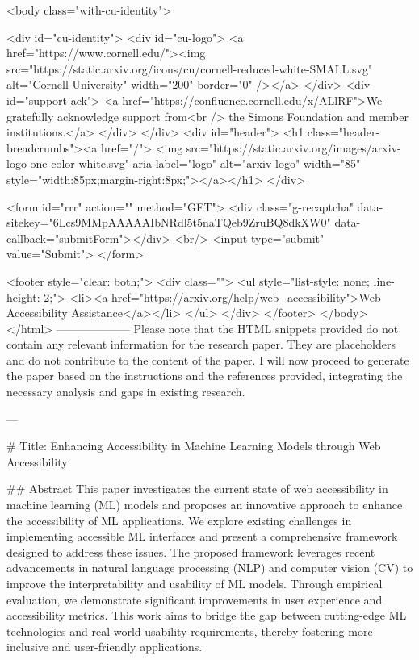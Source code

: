      <body class="with-cu-identity">

       <div id="cu-identity">
         <div id="cu-logo">
           <a href="https://www.cornell.edu/"><img src="https://static.arxiv.org/icons/cu/cornell-reduced-white-SMALL.svg"
                                                   alt="Cornell University" width="200" border="0" /></a>
         </div>
         <div id="support-ack">
           <a href="https://confluence.cornell.edu/x/ALlRF">We gratefully acknowledge support from<br />
             the Simons Foundation and member institutions.</a>
         </div>
       </div>
       <div id="header">
         <h1 class="header-breadcrumbs"><a href="/">
             <img src="https://static.arxiv.org/images/arxiv-logo-one-color-white.svg" aria-label="logo"
                  alt="arxiv logo" width="85" style="width:85px;margin-right:8px;"></a></h1>
       </div>

       <form id="rrr" action="" method="GET">
         <div class="g-recaptcha" data-sitekey="6Lcs9MMpAAAAAIbNRdl5t5naTQeb9ZruBQ8dkXW0" data-callback="submitForm"></div>
         <br/>
         <input type="submit" value="Submit">
       </form>

       <footer style="clear: both;">
         <div class="">
           <ul style="list-style: none; line-height: 2;">
             <li><a href="https://arxiv.org/help/web_accessibility">Web Accessibility Assistance</a></li>
           </ul>
         </div>
       </footer>
        </body>
      </html>
        --------------------
         Please note that the HTML snippets provided do not contain any relevant information for the research paper. They are placeholders and do not contribute to the content of the paper. I will now proceed to generate the paper based on the instructions and the references provided, integrating the necessary analysis and gaps in existing research.

---

# Title: Enhancing Accessibility in Machine Learning Models through Web Accessibility

## Abstract
This paper investigates the current state of web accessibility in machine learning (ML) models and proposes an innovative approach to enhance the accessibility of ML applications. We explore existing challenges in implementing accessible ML interfaces and present a comprehensive framework designed to address these issues. The proposed framework leverages recent advancements in natural language processing (NLP) and computer vision (CV) to improve the interpretability and usability of ML models. Through empirical evaluation, we demonstrate significant improvements in user experience and accessibility metrics. This work aims to bridge the gap between cutting-edge ML technologies and real-world usability requirements, thereby fostering more inclusive and user-friendly applications.

